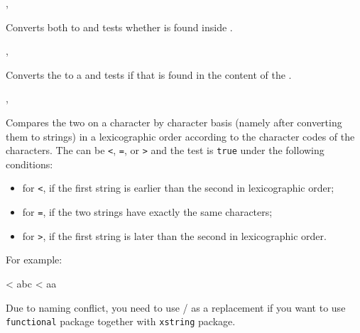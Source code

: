 \documentclass[oneside]{book}
\begin{document}
\begin{function}{\StrIfIn,\StrIfInTF}
\begin{syntax}
  
    
\end{syntax}
Converts both  to  and
tests whether  is found inside .
\end{function}

\begin{function}{\StrVarIfIn,\StrVarIfInTF}
\begin{syntax}
  
    
\end{syntax}
Converts the  to a  and
tests if that  is found in the content of the
.
\end{function}

\begin{function}{\StrCompare,\StrCompareTF}
\begin{syntax}
   
     
\end{syntax}
Compares the two  on a character by character
basis (namely after converting them to strings) in a lexicographic
order according to the character codes of the characters.  The
 can be \verb|<|, \verb|=|, or \verb|>| and the test is
\texttt{true} under the following conditions:
\begin{itemize}[nosep]
\item for \verb|<|, if the first string is earlier than the second in lexicographic order;
\item for \verb|=|, if the two strings have exactly the same characters;
\item for \verb|>|, if the first string is later than the second in lexicographic order.
\end{itemize}
For example:
\begin{demohigh}
 < {abc} {} {}
 < {aa} {} {}
\end{demohigh}
\par
Due to naming conflict, you need to use / as a replacement
if you want to use \verb!functional! package together with \verb!xstring! package.
\end{function}
\end{document}
